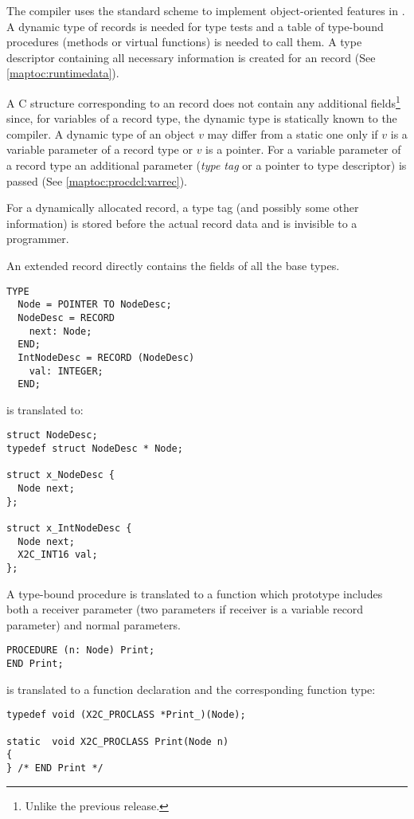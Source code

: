 The compiler uses the standard scheme to implement
object-oriented  features  in \ot{}. A dynamic type of records is
needed for type tests and a table of type-bound procedures (methods
or  virtual  functions)  is  needed  to call  them.  A type
descriptor  containing all necessary information
is   created   for   an   \ot{}   record   (See
\ref{maptoc:runtimedata}).

A  C structure corresponding to an \ot{} record does not contain any
additional  fields\footnote{Unlike  the previous \xds{} release.}
since, for variables of a record type, the dynamic type is statically
known to the compiler.  A  dynamic type of an object $v$ may differ
from a static  one  only  if $v$ is a variable parameter of a record
type or $v$ is a pointer. For a variable parameter of a record type
an  additional  parameter  ({\em  type  tag}  or  a pointer to type
descriptor) is passed (See \ref{maptoc:procdcl:varrec}).

For a dynamically allocated record, a type tag (and possibly some
other information) is stored before the actual record data and is
invisible to a programmer.

An extended record directly contains the fields of all the base types.
\begin{verbatim}
TYPE
  Node = POINTER TO NodeDesc;
  NodeDesc = RECORD
    next: Node;
  END;
  IntNodeDesc = RECORD (NodeDesc)
    val: INTEGER;
  END;
\end{verbatim}
is translated to:
\begin{verbatim}
struct NodeDesc;
typedef struct NodeDesc * Node;

struct x_NodeDesc {
  Node next;
};

struct x_IntNodeDesc {
  Node next;
  X2C_INT16 val;
};
\end{verbatim}

A   type-bound  procedure  is  translated  to  a  function  which
prototype  includes  both a receiver  parameter (two parameters if
receiver is a variable record parameter) and normal parameters.
\begin{verbatim}
PROCEDURE (n: Node) Print;
END Print;
\end{verbatim}
is translated to a function declaration and the corresponding function type:
\begin{verbatim}
typedef void (X2C_PROCLASS *Print_)(Node);

static  void X2C_PROCLASS Print(Node n)
{
} /* END Print */
\end{verbatim}

